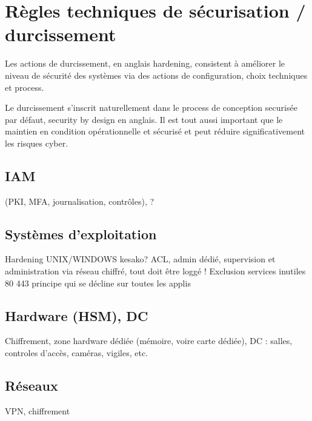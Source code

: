 \section{Règles techniques de sécurisation / durcissement}

Les actions de durcissement, en anglais hardening, consistent à améliorer le niveau de sécurité des systèmes via des actions de configuration, choix techniques et process.

Le durcissement s'inscrit naturellement dans le process de conception securisée par défaut, security by design en anglais. Il est tout aussi important que le maintien en condition opérationnelle et sécurisé et peut réduire significativement les risques cyber.

\subsection{IAM} 
(PKI, MFA, journalisation, contrôles), ?
\subsection{Systèmes d'exploitation}
Hardening UNIX/WINDOWS kesako?
ACL, admin dédié, supervision et administration via réseau chiffré, tout doit être loggé ! Exclusion services inutiles
80 443 principe qui se décline sur toutes les applis
\subsection{Hardware (HSM), DC}
Chiffrement, zone hardware dédiée (mémoire, voire carte dédiée), 
DC : salles, controles d’accès, caméras, vigiles, etc.
\subsection{Réseaux}
VPN, chiffrement



